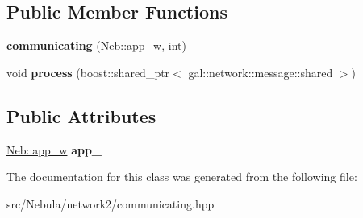 \subsection*{\-Public \-Member \-Functions}
\begin{DoxyCompactItemize}
\item 
\hypertarget{classNeb_1_1network_1_1communicating_a3121daaafd61fc137cb5504b71717078}{{\bfseries communicating} (\hyperlink{classNeb_1_1weak__ptr}{\-Neb\-::app\-\_\-w}, int)}\label{classNeb_1_1network_1_1communicating_a3121daaafd61fc137cb5504b71717078}

\item 
\hypertarget{classNeb_1_1network_1_1communicating_a78ae5a08958719f9ccae33e9078d734a}{void {\bfseries process} (boost\-::shared\-\_\-ptr$<$ gal\-::network\-::message\-::shared $>$)}\label{classNeb_1_1network_1_1communicating_a78ae5a08958719f9ccae33e9078d734a}

\end{DoxyCompactItemize}
\subsection*{\-Public \-Attributes}
\begin{DoxyCompactItemize}
\item 
\hypertarget{classNeb_1_1network_1_1communicating_a15215f50a4b77da570fb92926f72a835}{\hyperlink{classNeb_1_1weak__ptr}{\-Neb\-::app\-\_\-w} {\bfseries app\-\_\-}}\label{classNeb_1_1network_1_1communicating_a15215f50a4b77da570fb92926f72a835}

\end{DoxyCompactItemize}


\-The documentation for this class was generated from the following file\-:\begin{DoxyCompactItemize}
\item 
src/\-Nebula/network2/communicating.\-hpp\end{DoxyCompactItemize}
